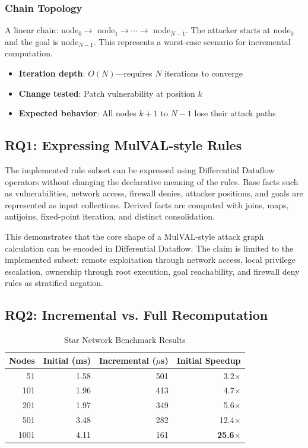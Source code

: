 \documentclass[conference]{IEEEtran}
\begin{document}
\subsubsection{Chain Topology}
A linear chain: node$_0 \rightarrow$ node$_1 \rightarrow \cdots \rightarrow$ node$_{N-1}$. The attacker starts at node$_0$ and the goal is node$_{N-1}$. This represents a worst-case scenario for incremental computation.

\begin{itemize}
    \item \textbf{Iteration depth}: $O(N)$---requires $N$ iterations to converge
    \item \textbf{Change tested}: Patch vulnerability at position $k$
    \item \textbf{Expected behavior}: All nodes $k+1$ to $N-1$ lose their attack paths
\end{itemize}

\subsection{RQ1: Expressing MulVAL-style Rules}

The implemented rule subset can be expressed using Differential Dataflow
operators without changing the declarative meaning of the rules. Base facts such
as vulnerabilities, network access, firewall denies, attacker positions, and
goals are represented as input collections. Derived facts are computed with
joins, maps, antijoins, fixed-point iteration, and distinct consolidation.

This demonstrates that the core shape of a MulVAL-style attack graph
calculation can be encoded in Differential Dataflow. The claim is limited to the
implemented subset: remote exploitation through network access, local privilege
escalation, ownership through root execution, goal reachability, and firewall
deny rules as stratified negation.

\subsection{RQ2: Incremental vs. Full Recomputation}

\begin{table}[H]
\centering
\caption{Star Network Benchmark Results}
\label{tab:star}
\begin{tabular}{@{}rrrr@{}}
\toprule
\textbf{Nodes} & \textbf{Initial (ms)} & \textbf{Incremental ($\mu$s)} & \textbf{Initial Speedup} \\
\midrule
51    & 1.58 & 501  & 3.2$\times$ \\
101   & 1.96 & 413  & 4.7$\times$ \\
201   & 1.97 & 349  & 5.6$\times$ \\
501   & 3.48 & 282  & 12.4$\times$ \\
1001  & 4.11 & 161  & \textbf{25.6$\times$} \\
\bottomrule
\end{tabular}
\end{table}
\end{document}
